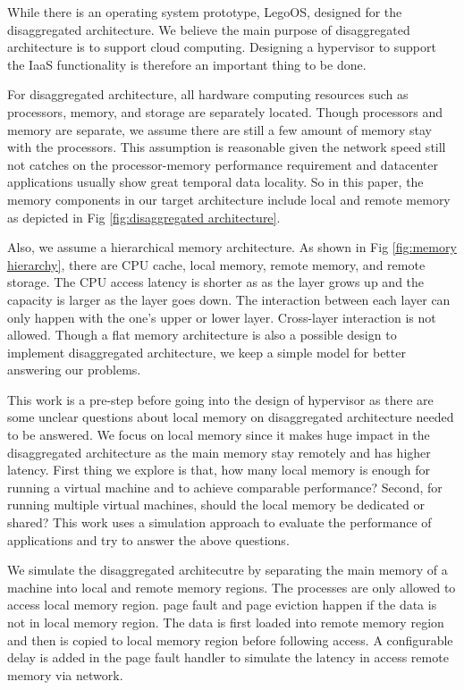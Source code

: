 \documentclass[twocolumn]{article}
\begin{document}
While there is an operating system prototype, LegoOS\cite{LegoOS}, designed for the disaggregated architecture. We believe the main purpose of disaggregated architecture is to support cloud computing. Designing a hypervisor to support the IaaS functionality is therefore an important thing to be done.

For disaggregated architecture, all hardware computing resources such as processors, memory, and storage are separately located. Though processors and memory are separate, we assume there are still a few amount of memory stay with the processors. This assumption is reasonable given the network speed still not catches on the processor-memory performance requirement\cite{Network_requirement} and datacenter applications usually show great temporal data locality\cite{NN_load,MapReduce_load}. So in this paper, the memory components in our target architecture include local and remote memory as depicted in Fig \ref{fig:disaggregated architecture}.

Also, we assume a hierarchical memory architecture. As shown in  Fig \ref{fig:memory hierarchy}, there are CPU cache, local memory, remote memory, and remote storage. The CPU access latency is shorter as as the layer grows up and the capacity is larger as the layer goes down. The interaction between each layer can only happen with the one's upper or lower layer. Cross-layer interaction is not allowed. Though a flat memory architecture is also a possible design to implement disaggregated architecture, we keep a simple model for better answering our problems.

This work is a pre-step before going into the design of hypervisor as there are some unclear questions about local memory on disaggregated architecture needed to be answered. We focus on local memory since it makes huge impact in the disaggregated architecture as the main memory stay remotely and has higher latency. First thing we explore is that, how many local memory is enough for running a virtual machine and to achieve comparable performance? Second, for running multiple virtual machines, should the local memory be dedicated or shared? This work uses a simulation approach to evaluate the performance of applications and try to answer the above questions.

We simulate the disaggregated architecutre by separating the main memory of a machine into local and remote memory regions. The processes are only allowed to access local memory region. page fault and page eviction happen if the data is not in local memory region. The data is first loaded into remote memory region and then is copied to local memory region before following access. A configurable delay is added in the page fault handler to simulate the latency in access remote memory via network.
\end{document}
